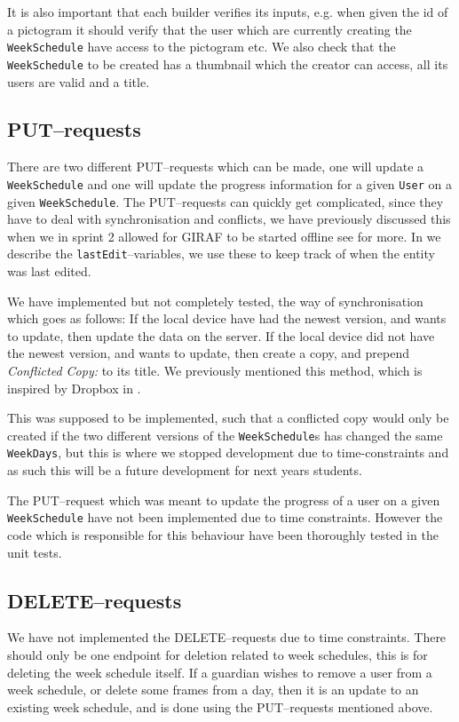 It is also important that each builder verifies its inputs, e.g. when given the id of a pictogram it should verify that the user which are currently creating the \texttt{WeekSchedule} have access to the pictogram etc.
We also check that the \texttt{WeekSchedule} to be created has a thumbnail which the creator can access, all its users are valid and a title.

\subsection{PUT--requests}
There are two different PUT--requests which can be made, one will update a \texttt{WeekSchedule} and one will update the progress information for a given \texttt{User} on a given \texttt{WeekSchedule}.
The PUT--requests can quickly get complicated, since they have to deal with synchronisation and conflicts, we have previously discussed this when we in sprint 2 allowed for GIRAF to be started offline see  for more.
In  we describe the \texttt{lastEdit}--variables, we use these to keep track of when the entity was last edited.

We have implemented but not completely tested, the way of synchronisation which goes as follows:
If the local device have had the newest version, and wants to update, then update the data on the server.
If the local device did not have the newest version, and wants to update, then create a copy, and prepend \textit{Conflicted Copy:} to its title.
We previously mentioned this method, which is inspired by Dropbox in .

This was supposed to be implemented, such that a conflicted copy would only be created if the two different versions of the \texttt{WeekSchedule}s has changed the same \texttt{WeekDays}, but this is where we stopped development due to time-constraints and as such this will be a future development for next years students.

The PUT--request which was meant to update the progress of a user on a given \texttt{WeekSchedule} have not been implemented due to time constraints.
However the code which is responsible for this behaviour have been thoroughly tested in the unit tests.

\subsection{DELETE--requests}
We have not implemented the DELETE--requests due to time constraints.
There should only be one endpoint for deletion related to week schedules, this is for deleting the week schedule itself.
If a guardian wishes to remove a user from a week schedule, or delete some frames from a day, then it is an update to an existing week schedule, and is done using the PUT--requests mentioned above.